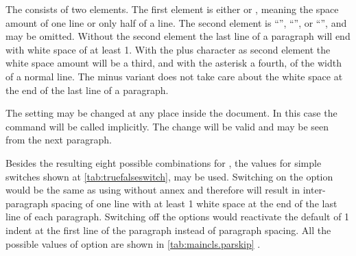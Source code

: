 \begin{Declaration}
\end{Declaration}

The  consists of two elements. The first element is either
 or , meaning the space amount of one line or only
half of a line. The second element is ``\PValue{*}'', ``\PValue{+}'', or
``\PValue{-}'', and may be omitted. Without the second element the last line
of a paragraph will end with white space of at least 1. With the plus
character as second element the white space amount will be a third, and with
the asterisk a fourth, of the width of a normal line. The minus variant does
not take care about the white space at the end of the last line of a
paragraph.

The setting may be changed at any place inside the document. In this case the
command %
will be called implicitly. The change will be valid and may be seen from the
next paragraph.

Besides the resulting eight possible combinations for , the values
for simple switches shown at \autoref{tab:truefalseswitch},
 may be used. Switching on the option would
be the same as using  without annex and therefore will result in
inter-paragraph spacing of one line with at least 1 white space at
the end of the last line of each paragraph. Switching off the options would
reactivate the default of 1 indent at the first line of the
paragraph instead of paragraph spacing. All the possible values of option
 are shown in \autoref{tab:maincls.parskip}%
%
.

